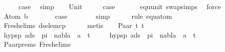\begin{isabellebody}
\ \ \isamarkupfalse%
\ \isamarkupfalse%
\ {\isacharquery}{\kern0pt}case\ \isamarkupfalse%
\ simp\isanewline
{}\isamarkupfalse%
\isanewline
\ \ \isamarkupfalse%
\ Unit\isanewline
\ \ \isamarkupfalse%
\ \isamarkupfalse%
\ {\isacharquery}{\kern0pt}case\ \isanewline
\ \ \ \ \isamarkupfalse%
\ equ{\isacharunderscore}{\kern0pt}unit\ swap{\isachardot}{\kern0pt}simps{\isacharparenleft}{\kern0pt}{}{\isacharparenright}{\kern0pt}\ \isamarkupfalse%
\ force\isanewline
{}\isamarkupfalse%
\isanewline
\ \ \isamarkupfalse%
\ {\isacharparenleft}{\kern0pt}Atom\ b{\isacharparenright}{\kern0pt}\isanewline
\ \ \ \ \isamarkupfalse%
\ \isamarkupfalse%
\ {\isacharquery}{\kern0pt}case\isanewline
\ \ \ \ \ \ \isamarkupfalse%
\ simp\isanewline
\ \ \ \ \isamarkupfalse%
\ {\isacharparenleft}{\kern0pt}rule\ equ{\isacharunderscore}{\kern0pt}atom{\isacharparenright}{\kern0pt}\isanewline
\ \ \ \ \isamarkupfalse%
\ Fresh{\isacharunderscore}{\kern0pt}elims{\isacharparenleft}{\kern0pt}{}{\isacharparenright}{\kern0pt}\ ds{\isacharunderscore}{\kern0pt}elem{\isacharunderscore}{\kern0pt}cp\isanewline
\ \ \ \ \isamarkupfalse%
\ metis\isanewline
{}\isamarkupfalse%
\isanewline
\ \ \isamarkupfalse%
\ {\isacharparenleft}{\kern0pt}Paar\ t{}\ t{}{\isacharparenright}{\kern0pt}\isanewline
\ \ \isamarkupfalse%
\ \isamarkupfalse%
\ hypsp{}{\isacharcolon}{\kern0pt}\ {\isachardoublequoteopen}{\isacharparenleft}{\kern0pt}{\isasymforall}a{\isasymin}ds\ {\isacharbrackleft}{\kern0pt}{\isacharbrackright}{\kern0pt}\ pi{\isachardot}{\kern0pt}\ \ nabla\ {\isasymturnstile}\ a\ {\isasymsharp}\ t{}{\isacharparenright}{\kern0pt}{\isachardoublequoteclose}\isanewline
\ \ \ \ \ hypsp{}{\isacharcolon}{\kern0pt}\ {\isachardoublequoteopen}{\isacharparenleft}{\kern0pt}{\isasymforall}a{\isasymin}ds\ {\isacharbrackleft}{\kern0pt}{\isacharbrackright}{\kern0pt}\ pi{\isachardot}{\kern0pt}\ \ nabla\ {\isasymturnstile}\ a\ {\isasymsharp}\ t{}{\isacharparenright}{\kern0pt}{\isachardoublequoteclose}\isanewline
\ \ \ \ \isamarkupfalse%
\ Paar{\isachardot}{\kern0pt}prems\ Fresh{\isacharunderscore}{\kern0pt}elims{\isacharparenleft}{\kern0pt}{}{\isacharparenright}{\kern0pt}\ \isamarkupfalse%

\end{isabellebody}
